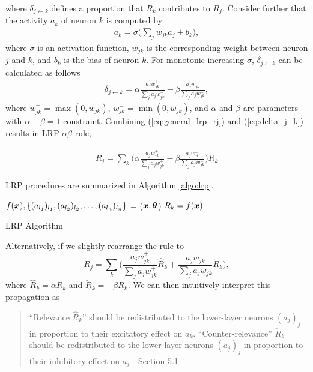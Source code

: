 where $\delta_{j\leftarrow k}$ defines a proportion that  $R_{k}$ contributes to $R_j$. Consider further that the activity $a_k$ of neuron $k$ is computed by 
\begin{align*}
	a_k = \sigma \bigg( \sum_{j} w_{jk} a_j + b_k \bigg),
\end{align*}
where $\sigma$ is an activation function, $w_{jk}$ is the corresponding weight between neuron $j$ and $k$, and $b_k$ is the bias of neuron $k$. For monotonic increasing $\sigma$, $\delta_{j\leftarrow k}$ can be calculated as follows 
\begin{align} \label{eq:delta_j_k}
	\delta_{j\leftarrow k} = \alpha\frac{a_j w_{jk}^+}{\sum_{j} a_jw_{jk}^+} - \beta\frac{a_j w_{jk}^-}{\sum_{j} a_jw_{jk}^-},
\end{align}
where $w_{jk}^+ = \max(0, w_{jk})$, $w_{jk}^- = \min(0, w_{jk})$, and $\alpha$ and $\beta$ are parameters with $\alpha-\beta = 1$ constraint. Combining (\ref{eq:general_lrp_rj}) and (\ref{eq:delta_j_k}) results in LRP-$\alpha\beta$ rule, 

\begin{align*}
	R_j = \sum_{k} 	\bigg( \alpha\frac{a_j w_{jk}^+}{\sum_{j} a_jw_{jk}^+} - \beta\frac{a_j w_{jk}^-}{\sum_{j} a_jw_{jk}^-} \bigg )  R_{k}
\end{align*}

LRP procedures are summarized in Algorithm \ref{algo:lrp}.

\begin{algorithm}[H]
$f(\patvector{x}), \{ (a_{l_1})_{l_1}, (a_{l_2})_{l_2}, \dots, (a_{l_n})_{l_n}\}$ = ($\patvector{x}, \patvector{\theta}$)\;
$R_k = f(\patvector{x})$\;
 \caption{LRP Algorithm}
 \label{algo:lrp}
\end{algorithm}


Alternatively, if we slightly rearrange  the rule to 
$$
	R_j = \sum_{k} \bigg( \frac{a_j w_{jk}^+}{\sum_{j} a_jw_{jk}^+} \hat{R}_{k} + \frac{a_j w_{jk}^-}{\sum_{j} a_jw_{jk}^-} \check{R}_{k} \bigg),
$$ 
where $\hat{R}_{k}  = \alpha R_{k}$ and  $\check{R}_{k} = -\beta R_{k} $. We can then intuitively interpret this propagation as 

\begin{quote}
``Relevance $\hat{R}_k$'' should be redistributed to the lower-layer neurons $(a_j)_j$ in proportion to their excitatory effect on $a_k$. ``Counter-relevance'' $\check{R}_k $ should be redistributed to the lower-layer neurons $(a_j)_j$ in proportion to their inhibitory effect on $a_j$
	- Section 5.1 \citep{MontavonMethodsinterpretingunderstanding2018}
\end{quote} 

